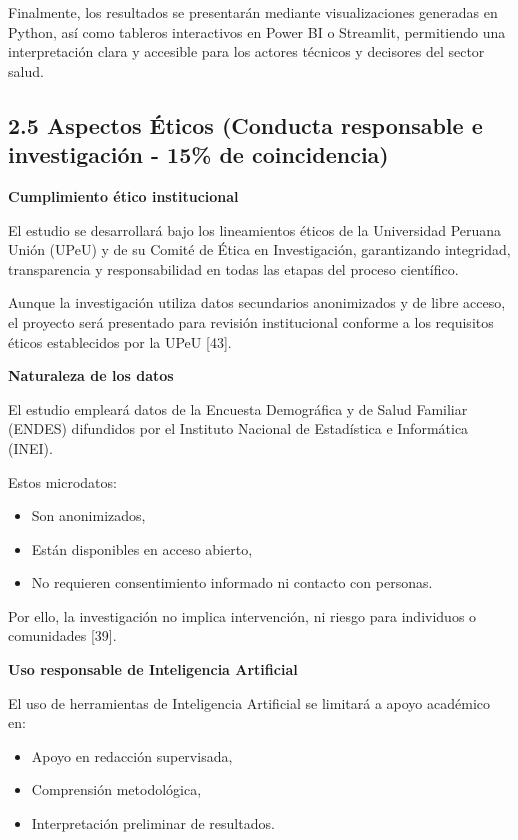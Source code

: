 \documentclass[
]{report}
\begin{document}
Finalmente, los resultados se presentarán mediante visualizaciones
generadas en Python, así como tableros interactivos en Power BI o
Streamlit, permitiendo una interpretación clara y accesible para los
actores técnicos y decisores del sector salud.

\hypertarget{aspectos-uxe9ticos-conducta-responsable-e-investigaciuxf3n---15-de-coincidencia}{%
\subsection{2.5 Aspectos Éticos (Conducta responsable e investigación -
15\% de
coincidencia)}\label{aspectos-uxe9ticos-conducta-responsable-e-investigaciuxf3n---15-de-coincidencia}}

\textbf{Cumplimiento ético institucional}

El estudio se desarrollará bajo los lineamientos éticos de la
Universidad Peruana Unión (UPeU) y de su Comité de Ética en
Investigación, garantizando integridad, transparencia y responsabilidad
en todas las etapas del proceso científico.

Aunque la investigación utiliza datos secundarios anonimizados y de
libre acceso, el proyecto será presentado para revisión institucional
conforme a los requisitos éticos establecidos por la UPeU {[}43{]}.

\textbf{Naturaleza de los datos}

El estudio empleará datos de la Encuesta Demográfica y de Salud Familiar
(ENDES) difundidos por el Instituto Nacional de Estadística e
Informática (INEI).

Estos microdatos:

\begin{itemize}
\item
  Son anonimizados,
\item
  Están disponibles en acceso abierto,
\item
  No requieren consentimiento informado ni contacto con personas.
\end{itemize}

Por ello, la investigación no implica intervención, ni riesgo para
individuos o comunidades {[}39{]}.

\textbf{Uso responsable de Inteligencia Artificial}

El uso de herramientas de Inteligencia Artificial se limitará a apoyo
académico en:

\begin{itemize}
\item
  Apoyo en redacción supervisada,
\item
  Comprensión metodológica,
\item
  Interpretación preliminar de resultados.
\end{itemize}
\end{document}

